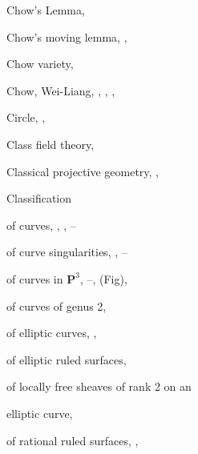 {{\noindent\hspace*{0.0bp}Chow's Lemma, \par
\noindent\hspace*{0.0bp}Chow's moving lemma, , \par
\noindent\hspace*{0.0bp}Chow variety, \par
\noindent\hspace*{0.0bp}Chow, Wei-Liang, , , , \par
\noindent\hspace*{0.0bp}Circle, , \par
\noindent\hspace*{0.0bp}Class field theory, \par
\noindent\hspace*{0.0bp}Classical projective geometry, , \par
\noindent\hspace*{0.0bp}Classification\par
\noindent\hspace*{7.5bp}of curves, , , --\par
\noindent\hspace*{7.5bp}of curve singularities, , --\par
\noindent\hspace*{7.5bp}of curves in $\mathbf P^3$, --,  (Fig), \par
\noindent\hspace*{7.5bp}of curves of genus 2, \par
\noindent\hspace*{7.5bp}of elliptic curves, , \par
\noindent\hspace*{7.5bp}of elliptic ruled surfaces, \par
\noindent\hspace*{7.5bp}of locally free sheaves of rank 2 on an\par
\noindent\hspace*{15.0bp}elliptic curve, \par
\noindent\hspace*{7.5bp}of rational ruled surfaces, , \par
}}

